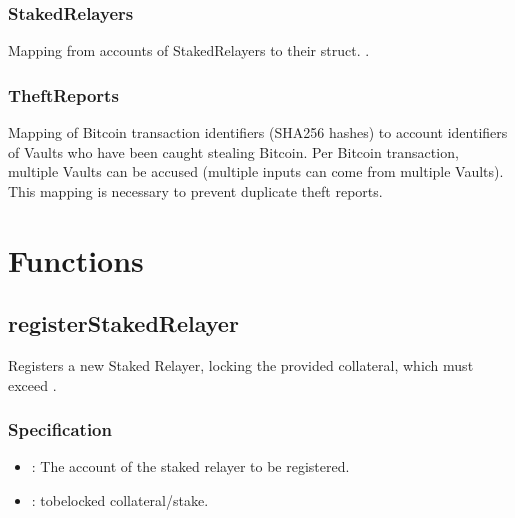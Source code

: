 \documentclass[a4paper,10pt,english]{sphinxmanual}
\begin{document}
\subsubsection{StakedRelayers}
\label{\detokenize{spec/staked-relayers:stakedrelayers}}
Mapping from accounts of StakedRelayers to their struct. .


\subsubsection{TheftReports}
\label{\detokenize{spec/staked-relayers:theftreports}}
Mapping of Bitcoin transaction identifiers (SHA256 hashes) to account identifiers of Vaults who have been caught stealing Bitcoin.
Per Bitcoin transaction, multiple Vaults can be accused (multiple inputs can come from multiple Vaults).
This mapping is necessary to prevent duplicate theft reports.


\section{Functions}
\label{\detokenize{spec/staked-relayers:functions}}

\subsection{registerStakedRelayer}
\label{\detokenize{spec/staked-relayers:registerstakedrelayer}}\label{\detokenize{spec/staked-relayers:id2}}
Registers a new Staked Relayer, locking the provided collateral, which must exceed .


\subsubsection{Specification}
\label{\detokenize{spec/staked-relayers:specification}}


\begin{itemize}
\item {} 
: The account of the staked relayer to be registered.

\item {} 
: to\sphinxhyphen{}be\sphinxhyphen{}locked collateral/stake.

\end{itemize}
\end{document}
